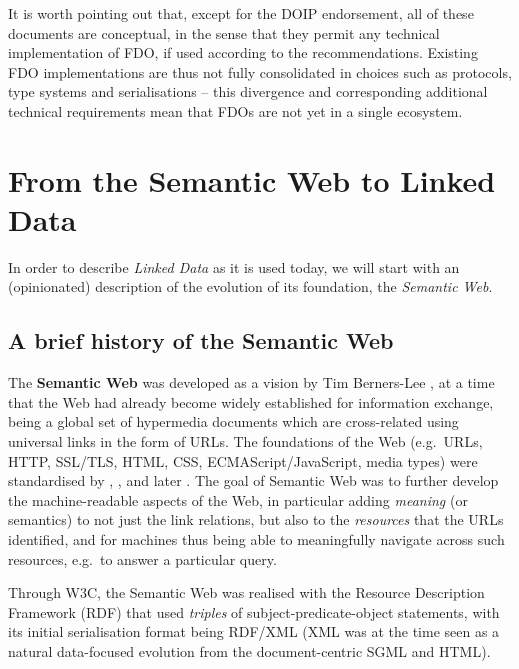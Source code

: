 It is worth pointing out that, except for the DOIP endorsement, all of these documents are conceptual, in the sense that they permit any technical implementation of FDO, if used according to the recommendations. 
Existing FDO implementations \cite{wittenburgFAIRDigitalObject2022b} are thus not fully consolidated in choices such as protocols, type systems and serialisations -- this divergence and corresponding additional technical requirements mean that FDOs are not yet in a single ecosystem.


\section{From the Semantic Web to Linked Data}\label{ch3:ld}

In order to describe \emph{Linked Data} as it is used today, we will start with an (opinionated) description of the evolution of its foundation, the \emph{Semantic Web}.

\subsection{A brief history of the Semantic Web}\label{ch3:semweb}

The \textbf{Semantic Web} was developed as a vision by Tim Berners-Lee \cite{berners-leeWeavingWebOriginal1999}, at a time that the Web had already become widely established for information exchange, being a global set of hypermedia documents which are cross-related using universal links in the form of URLs. The foundations of the Web (e.g.~URLs, HTTP, SSL/TLS, HTML, CSS, ECMAScript/JavaScript, media types) were standardised by , ,  and later . The goal of Semantic Web was to further develop the machine-readable aspects of the Web, in particular adding \emph{meaning} (or semantics) to not just the link relations, but also to the \emph{resources} that the URLs identified, and for machines thus being able to meaningfully navigate across such resources, e.g.~to answer a particular query.

Through W3C, the Semantic Web was realised with the Resource Description Framework (RDF) \cite{w3-rdf11-primer} that used \emph{triples} of subject-predicate-object statements, with its initial serialisation format \cite{w3-rdf-syntax99} being RDF/XML (XML was at the time seen as a natural data-focused evolution from the document-centric SGML and HTML).

